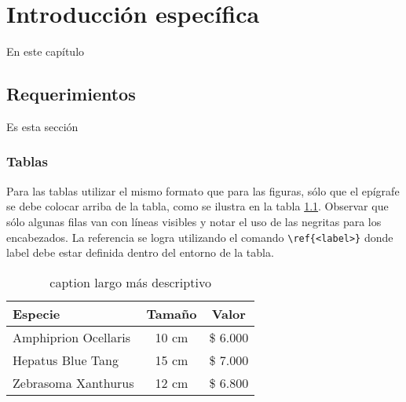 \chapter{Introducción específica} %

\label{Chapter2}

En este capítulo


\section{Requerimientos}
\label{sec:requerimientos}

Es esta sección

\subsection{Tablas}

Para las tablas utilizar el mismo formato que para las figuras, sólo que el epígrafe se debe colocar arriba de la tabla, como se ilustra en la tabla \ref{tab:peces}. Observar que sólo algunas filas van con líneas visibles y notar el uso de las negritas para los encabezados.  La referencia se logra utilizando el comando \verb|\ref{<label>}| donde label debe estar definida dentro del entorno de la tabla.

\begin{table}[h]
	\centering
	\caption[caption corto]{caption largo más descriptivo}
	\begin{tabular}{l c c}    
		\toprule
		\textbf{Especie}     & \textbf{Tamaño} & \textbf{Valor}\\
		\midrule
		Amphiprion Ocellaris & 10 cm           & \$ 6.000 \\		
		Hepatus Blue Tang    & 15 cm           & \$ 7.000 \\
		Zebrasoma Xanthurus  & 12 cm           & \$ 6.800 \\
		\bottomrule
		\hline
	\end{tabular}
	\label{tab:peces}
\end{table}


